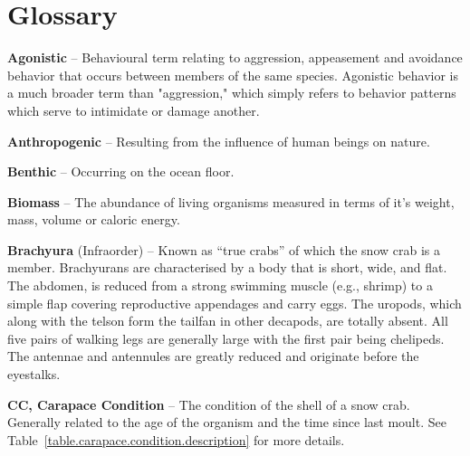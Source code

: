 \documentclass[11pt]{article}
\begin{document}
\clearpage \newpage


\appendix



\clearpage
\newpage
\section{Glossary}


\textbf{Agonistic} -- Behavioural term relating to aggression, appeasement and avoidance behavior that occurs between members of the same species. Agonistic behavior is a much broader term than "aggression," which simply refers to behavior patterns which serve to intimidate or damage another.

\textbf{Anthropogenic} -- Resulting from the influence of human beings on nature.

\textbf{Benthic} -- Occurring on the ocean floor.

\textbf{Biomass} -- The abundance of living organisms measured in terms of it's weight, mass, volume or caloric energy.

\textbf{Brachyura} (Infraorder) -- Known as ``true crabs'' of which the snow crab is a member. Brachyurans are characterised by a body that is short, wide, and flat. The abdomen, is reduced from a strong swimming muscle (e.g., shrimp) to a simple flap covering reproductive appendages and carry eggs. The uropods, which along with the telson form the tailfan in other decapods, are totally absent. All five pairs of walking legs are generally large with the first pair being chelipeds. The antennae and antennules are greatly reduced and originate before the eyestalks.

\textbf{CC, Carapace Condition} -- The condition of the shell of a snow crab. Generally related to the age of the organism and the time since last moult. See Table~\ref{table.carapace.condition.description} for more details.
\end{document}
